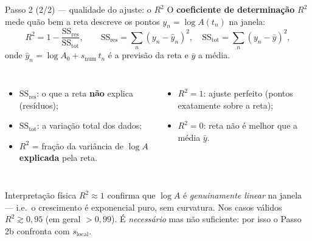 \documentclass[aspectratio=169,11pt]{beamer}
\newcommand{\snum}{s_{\mathrm{num}}}
\newcommand{\sloc}{s_{\mathrm{local}}}
\begin{document}
\begin{frame}{Passo 2 (2/2) — qualidade do ajuste: o $R^2$}
  O \textbf{coeficiente de determinação} $R^2$ mede quão bem a reta descreve os
  pontos $y_n=\log A(t_n)$ na janela:
  \begin{equation*}
    R^2 = 1 - \frac{\mathrm{SS_{res}}}{\mathrm{SS_{tot}}},
    \qquad
    \mathrm{SS_{res}} = \sum_n (y_n - \hat y_n)^2,
    \quad
    \mathrm{SS_{tot}} = \sum_n (y_n - \bar y)^2,
  \end{equation*}
  onde $\hat y_n = \log A_0 + \snum\,t_n$ é a previsão da reta e $\bar y$ a média.
  \begin{columns}[T]
    \footnotesize
    \begin{itemize}
      \item $\mathrm{SS_{res}}$: o que a reta \textbf{não} explica (resíduos);
      \item $\mathrm{SS_{tot}}$: a variação total dos dados;
      \item $R^2$ = fração da variância de $\log A$ \textbf{explicada} pela reta.
    \end{itemize}
    \footnotesize
    \begin{itemize}
      \item $R^2=1$: ajuste perfeito (pontos exatamente sobre a reta);
      \item $R^2=0$: reta não é melhor que a média $\bar y$.
    \end{itemize}
  \end{columns}
  \vspace{0.3em}
  \begin{alertblock}{Interpretação física}
    \footnotesize
    $R^2\approx 1$ confirma que $\log A$ é \emph{genuinamente linear} na janela
    — i.e.\ o crescimento é exponencial puro, sem curvatura. Nos casos válidos
    $R^2\gtrsim 0{,}95$ (em geral $>0{,}99$). É \emph{necessário} mas não
    suficiente: por isso o Passo 2b confronta com $\sloc$.
  \end{alertblock}
\end{frame}
\end{document}

